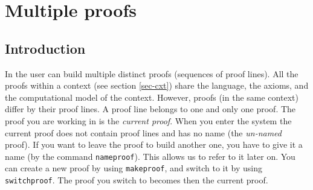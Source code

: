 \section{Multiple proofs}
\label{sec-proof}

\subsection{Introduction}

In {\GF} the user can build multiple distinct proofs (sequences of proof lines).
All the proofs within a context (see section \ref{sec-cxt}) share the language,
the  axioms, and the computational model of the context.
However, proofs (in the same context) differ by their proof lines. A proof  line
belongs to one and only  one proof.
The proof you are working in is the {\em current  proof}.
When you enter the system the current proof does not contain proof lines and has
no name (the {\em un-named} proof).
If you want to leave the proof to build another one, you have to give it a name
(by the command {\tt nameproof}).
This allows us to refer to it later on.
You can create a new proof by using {\tt makeproof}, and  switch to it by using
{\tt switchproof}. The proof you switch to becomes then the current proof.

